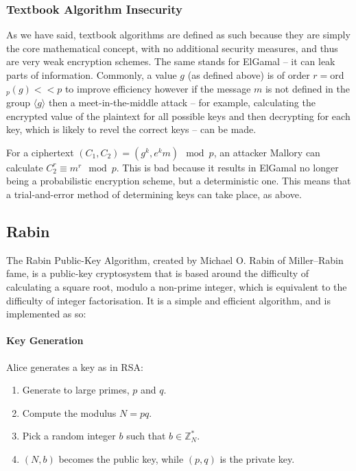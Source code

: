     \subsubsection{Textbook Algorithm Insecurity}
    
    As we have said, textbook algorithms are defined as such because they are simply the core mathematical concept, with no additional security measures, and thus are very weak encryption schemes. The same stands for ElGamal -- it can leak parts of information. Commonly, a value $g$ (as defined above) is of order $r = $ord$_p(g) << p$ to improve efficiency\cite{Mao:2003uq} however if the message $m$ is not defined in the group $\langle g \rangle$ then a meet-in-the-middle attack -- for example, calculating the encrypted value of the plaintext for all possible keys and then decrypting for each key, which is likely to revel the correct keys -- can be made. 
    
    For a ciphertext $(C_1,C_2) = (g^k, e^km) \mod p$, an attacker Mallory can calculate $C_2^r \equiv m^r \mod p$. This is bad because it results in ElGamal no longer being a probabilistic encryption scheme, but a deterministic one. This means that a trial-and-error method of determining keys can take place, as above.
  
  \subsection{Rabin}
  
  The Rabin Public-Key Algorithm, created by Michael O. Rabin of Miller--Rabin fame, is a public-key cryptosystem that is based around the difficulty of calculating a square root, modulo a non-prime integer, which is equivalent to the difficulty of integer factorisation. It is a simple and efficient algorithm, and is implemented as so:
  
  \paragraph{Key Generation}
  
  Alice generates a key as in RSA:
  
  \begin{enumerate}
    \item Generate to large primes, $p$ and $q$.
    \item Compute the modulus $N = pq$.
    \item Pick a random integer $b$ such that $b \in \mathbb{Z}_N^*$.
    \item $(N,b)$ becomes the public key, while $(p,q)$ is the private key.
  \end{enumerate}
  

